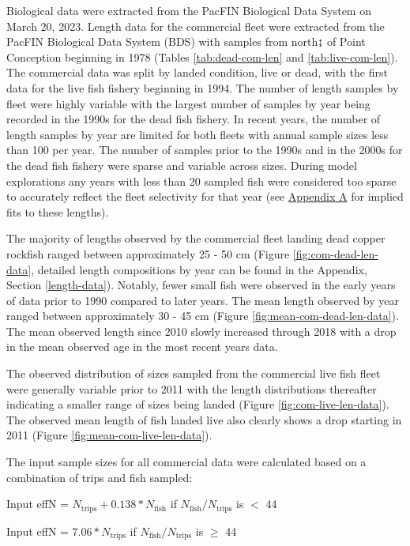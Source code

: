 \documentclass[11pt,
  english,
  letterpaper,
]{article}
\begin{document}
\hfill\break

Biological data were extracted from the PacFIN Biological Data System on March 20, 2023. Length data for the commercial fleet were extracted from the PacFIN Biological Data System (BDS) with samples from north↨ of Point Conception beginning in 1978 (Tables \ref{tab:dead-com-len} and \ref{tab:live-com-len}). The commercial data was split by landed condition, live or dead, with the first data for the live fish fishery beginning in 1994. The number of length samples by fleet were highly variable with the largest number of samples by year being recorded in the 1990s for the dead fish fishery. In recent years, the number of length samples by year are limited for both fleets with annual sample sizes less than 100 per year. The number of samples prior to the 1990s and in the 2000s for the dead fish fishery were sparse and variable across sizes. During model explorations any years with less than 20 sampled fish were considered too sparse to accurately reflect the fleet selectivity for that year (see \protect\hyperlink{excluded-data}{Appendix A} for implied fits to these lengths).

The majority of lengths observed by the commercial fleet landing dead copper rockfish ranged between approximately 25 - 50 cm (Figure \ref{fig:com-dead-len-data}, detailed length compositions by year can be found in the Appendix, Section \ref{length-data}). Notably, fewer small fish were observed in the early years of data prior to 1990 compared to later years. The mean length observed by year ranged between approximately 30 - 45 cm (Figure \ref{fig:mean-com-dead-len-data}). The mean observed length since 2010 slowly increased through 2018 with a drop in the mean observed age in the most recent years data.

The observed distribution of sizes sampled from the commercial live fish fleet were generally variable prior to 2011 with the length distributions thereafter indicating a smaller range of sizes being landed (Figure \ref{fig:com-live-len-data}). The observed mean length of fish landed live also clearly shows a drop starting in 2011 (Figure \ref{fig:mean-com-live-len-data}).

The input sample sizes for all commercial data were calculated based on a combination of trips and fish sampled:

\begin{centering}

Input effN = $N_{\text{trips}} + 0.138 * N_{\text{fish}}$ if $N_{\text{fish}}/N_{\text{trips}}$ is $<$ 44

Input effN = $7.06 * N_{\text{trips}}$ if $N_{\text{fish}}/N_{\text{trips}}$ is $\geq$ 44

\end{centering}
\end{document}

